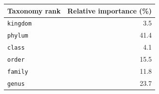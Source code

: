 \begin{tabular}{lr}
\toprule
Taxonomy rank & Relative importance (\%) \\
\midrule
\texttt{kingdom} & 3.5 \\
\texttt{phylum} & 41.4 \\
\texttt{class} & 4.1 \\
\texttt{order} & 15.5 \\
\texttt{family} & 11.8 \\
\texttt{genus} & 23.7 \\
\bottomrule
\end{tabular}
